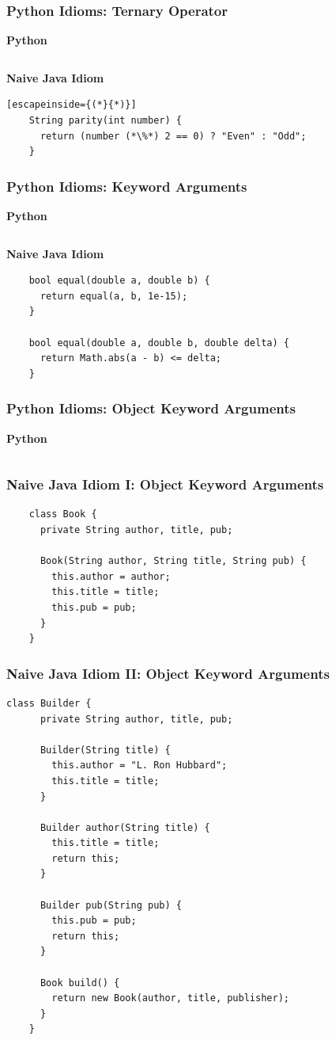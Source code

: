 \documentclass{beamer}
\begin{document}
\begin{frame}[fragile]
  \frametitle{Python Idioms: Ternary Operator}
  \textbf{Python}
  \inputminted{python}{ternary.py}
  
  \textbf{Naive Java Idiom}
  \begin{lstlisting}[escapeinside={(*}{*)}]
    String parity(int number) {
      return (number (*\%*) 2 == 0) ? "Even" : "Odd";
    }
  \end{lstlisting}
\end{frame}


\begin{frame}[fragile]
  \frametitle{Python Idioms: Keyword Arguments}
  \textbf{Python}
  \inputminted{python}{keyword.py}
  
  \textbf{Naive Java Idiom}
  \begin{lstlisting}
    bool equal(double a, double b) {
      return equal(a, b, 1e-15); 
    }

    bool equal(double a, double b, double delta) {
      return Math.abs(a - b) <= delta;
    }
   \end{lstlisting}
\end{frame}

\begin{frame}
  \frametitle{Python Idioms: Object Keyword Arguments}
  \textbf{Python}
  \inputminted{python}{book.py}
\end{frame}

  
\begin{frame}[fragile]
  \frametitle{Naive Java Idiom I: Object Keyword Arguments}
  \begin{lstlisting}
    class Book {
      private String author, title, pub;

      Book(String author, String title, String pub) {
        this.author = author;
        this.title = title;
        this.pub = pub;
      }
    }
  \end{lstlisting}
\end{frame}


\begin{frame}[fragile]
  \frametitle{Naive Java Idiom II: Object Keyword Arguments}
  \begin{lstlisting}[basicstyle=\tiny]
    class Builder {
      private String author, title, pub;

      Builder(String title) {
        this.author = "L. Ron Hubbard";
        this.title = title;
      }

      Builder author(String title) {
        this.title = title;
        return this;
      }
 
      Builder pub(String pub) {
        this.pub = pub;
        return this;
      }

      Book build() {
        return new Book(author, title, publisher);
      }
    }
  \end{lstlisting}
\end{frame}
\end{document}
